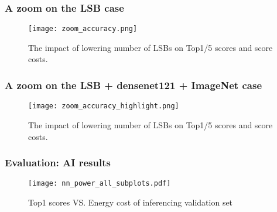 \begin{frame}
\frametitle{A zoom on the LSB case}
\begin{figure}
	\centering
	\texttt{[image: zoom\_accuracy.png]}
	\vspace{-10pt}
	\caption{The impact of lowering number of LSBs on Top1/5 scores and score costs.}
\end{figure}
\end{frame}

\begin{frame}
\frametitle{A zoom on the LSB + densenet121 + ImageNet case}
\begin{figure}
	\centering
	\texttt{[image: zoom\_accuracy\_highlight.png]}
	\vspace{-10pt}
	\caption{The impact of lowering number of LSBs on Top1/5 scores and score costs.}
\end{figure}
\end{frame}

\begin{frame}
\frametitle{Evaluation: AI results}

\begin{figure}
	\centering
	\texttt{[image: nn\_power\_all\_subplots.pdf]}
	\vspace{-4mm}
	\caption{Top1 scores VS. Energy cost of inferencing validation set}
\end{figure}

\normalsize
\end{frame}

